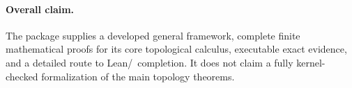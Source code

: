 \paragraph{Overall claim.}
The package supplies a developed general framework, complete finite mathematical proofs for its core topological calculus, executable exact evidence, and a detailed route to Lean/\ipra\ completion.  It does not claim a fully kernel-checked formalization of the main topology theorems.
